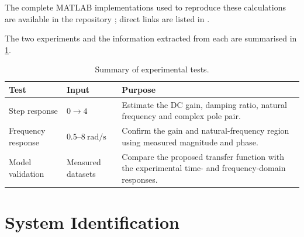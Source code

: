 \documentclass[12pt,a4paper]{article}
\begin{document}
The complete MATLAB implementations used to reproduce these
calculations are available in the repository \cite{githubrepo};
direct links are listed in .

The two experiments and the information extracted from each are
summarised in \cref{tab:testplan}.

\begin{table}[H]
    \centering
    \caption{Summary of experimental tests.}
    \label{tab:testplan}

    \renewcommand{\arraystretch}{1.35}

    \begin{tabular}{
        |>{\centering\arraybackslash}p{}
        |>{\centering\arraybackslash}p{}
        |p{}|
    }
        \hline

        \rowcolor{gray!15}
        \textbf{Test} &
        \textbf{Input} &
        \textbf{Purpose} \\

        \hline

        Step response &
        $0 \rightarrow 4$ &
        Estimate the DC gain, damping ratio, natural frequency and complex pole pair. \\

        \hline

        Frequency response &
        $0.5$--$8~\mathrm{rad/s}$ &
        Confirm the gain and natural-frequency region using measured magnitude and phase. \\

        \hline

        Model validation &
        Measured datasets &
        Compare the proposed transfer function with the experimental time- and frequency-domain responses. \\

        \hline

    \end{tabular}
\end{table}


\section{System Identification}
\label{sec:system_id}

\end{document}
